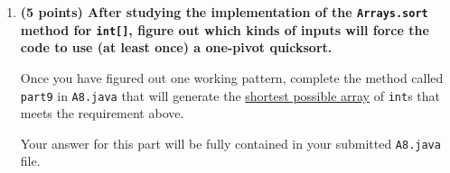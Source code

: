 \documentclass[12pt]{article}
\begin{document}
\begin{enumerate}
{   Algorithm \#1 =  \fbox{\color{black}{algorithm name}}\newline

   Algorithm \#2 =  \fbox{\color{black}{algorithm name}}\newline

   Algorithm \#3 =  \fbox{\color{black}{algorithm name}}\newline

   Algorithm \#4 =  \fbox{\color{black}{algorithm name}}\newline

   Algorithm \#5 =  \fbox{\color{black}{algorithm name}}\newline

   Algorithm \#6 =  \fbox{\color{black}{algorithm name}}\newline

   Note: You may not be able to fill in all of the boxes above. Delete the boxes
   that you end up not needing, if any.
   }


   \item                            %
   {\bf \color{red} (5 points) After studying the implementation of the
   {\tt Arrays.sort} method for {\tt int[]}, figure out which kinds of inputs
   will force the code to use (at least once) a one-pivot quicksort.

   Once you have figured out one working pattern, complete the method called
   {\tt part9} in {\tt A8.java} that will generate the \underline{shortest
   possible array} of {\tt int}s that meets the requirement above.

   Your answer for this part will be fully contained in your submitted
   {\tt A8.java} file.

}
\end{enumerate}
\end{document}
